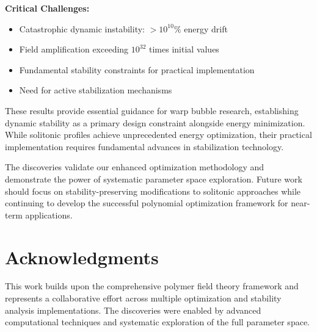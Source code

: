 \documentclass[12pt,a4paper]{article}
\begin{document}
\textbf{Critical Challenges:}
\begin{itemize}
\item Catastrophic dynamic instability: $> 10^{10}\%$ energy drift
\item Field amplification exceeding $10^{32}$ times initial values
\item Fundamental stability constraints for practical implementation
\item Need for active stabilization mechanisms
\end{itemize}

These results provide essential guidance for warp bubble research, establishing dynamic stability as a primary design constraint alongside energy minimization. While solitonic profiles achieve unprecedented energy optimization, their practical implementation requires fundamental advances in stabilization technology.

The discoveries validate our enhanced optimization methodology and demonstrate the power of systematic parameter space exploration. Future work should focus on stability-preserving modifications to solitonic approaches while continuing to develop the successful polynomial optimization framework for near-term applications.

\section*{Acknowledgments}

This work builds upon the comprehensive polymer field theory framework and represents a collaborative effort across multiple optimization and stability analysis implementations. The discoveries were enabled by advanced computational techniques and systematic exploration of the full parameter space.
\end{document}

